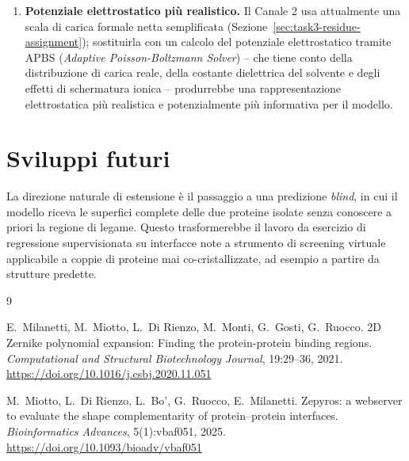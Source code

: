 \documentclass[11pt,a4paper]{article}
\begin{document}
\begin{enumerate}
    \item \textbf{Potenziale elettrostatico più realistico.} Il Canale 2 usa attualmente una scala di carica formale netta semplificata (Sezione~\ref{sec:task3-residue-assignment}); sostituirla con un calcolo del potenziale elettrostatico tramite APBS (\emph{Adaptive Poisson-Boltzmann Solver}) -- che tiene conto della distribuzione di carica reale, della costante dielettrica del solvente e degli effetti di schermatura ionica -- produrrebbe una rappresentazione elettrostatica più realistica e potenzialmente più informativa per il modello.
\end{enumerate}

\section{Sviluppi futuri}
La direzione naturale di estensione è il passaggio a una predizione \emph{blind}, in cui il modello riceva le superfici complete delle due proteine isolate senza conoscere a priori la regione di legame. Questo trasformerebbe il lavoro da esercizio di regressione supervisionata su interfacce note a strumento di screening virtuale applicabile a coppie di proteine mai co-cristallizzate, ad esempio a partire da strutture predette.

\begin{thebibliography}{9}

E.~Milanetti, M.~Miotto, L.~Di Rienzo, M.~Monti, G.~Gosti, G.~Ruocco.
\newblock 2D Zernike polynomial expansion: Finding the protein-protein binding regions.
\newblock \emph{Computational and Structural Biotechnology Journal}, 19:29--36, 2021.
\newblock \url{https://doi.org/10.1016/j.csbj.2020.11.051}

M.~Miotto, L.~Di Rienzo, L.~Bo', G.~Ruocco, E.~Milanetti.
\newblock Zepyros: a webserver to evaluate the shape complementarity of protein--protein interfaces.
\newblock \emph{Bioinformatics Advances}, 5(1):vbaf051, 2025.
\newblock \url{https://doi.org/10.1093/bioadv/vbaf051}

\end{thebibliography}
 
\end{document}
